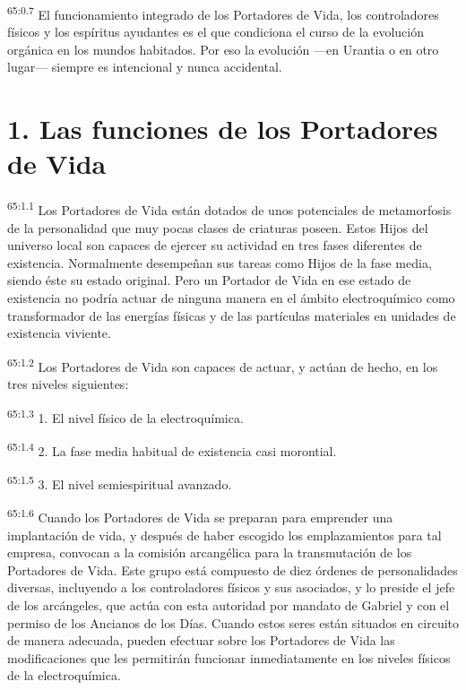 \par
\textsuperscript{65:0.7} El funcionamiento integrado de los Portadores de Vida, los controladores físicos y los espíritus ayudantes es el que condiciona el curso de la evolución orgánica en los mundos habitados. Por eso la evolución ---en Urantia o en otro lugar--- siempre es intencional y nunca accidental.

\section*{1. Las funciones de los Portadores de Vida}
\par
\textsuperscript{65:1.1} Los Portadores de Vida están dotados de unos potenciales de metamorfosis de la personalidad que muy pocas clases de criaturas poseen. Estos Hijos del universo local son capaces de ejercer su actividad en tres fases diferentes de existencia. Normalmente desempeñan sus tareas como Hijos de la fase media, siendo éste su estado original. Pero un Portador de Vida en ese estado de existencia no podría actuar de ninguna manera en el ámbito electroquímico como transformador de las energías físicas y de las partículas materiales en unidades de existencia viviente.

\par
\textsuperscript{65:1.2} Los Portadores de Vida son capaces de actuar, y actúan de hecho, en los tres niveles siguientes:

\par
\textsuperscript{65:1.3} 1. El nivel físico de la electroquímica.

\par
\textsuperscript{65:1.4} 2. La fase media habitual de existencia casi morontial.

\par
\textsuperscript{65:1.5} 3. El nivel semiespiritual avanzado.

\par
\textsuperscript{65:1.6} Cuando los Portadores de Vida se preparan para emprender una implantación de vida, y después de haber escogido los emplazamientos para tal empresa, convocan a la comisión arcangélica para la transmutación de los Portadores de Vida. Este grupo está compuesto de diez órdenes de personalidades diversas, incluyendo a los controladores físicos y sus asociados, y lo preside el jefe de los arcángeles, que actúa con esta autoridad por mandato de Gabriel y con el permiso de los Ancianos de los Días. Cuando estos seres están situados en circuito de manera adecuada, pueden efectuar sobre los Portadores de Vida las modificaciones que les permitirán funcionar inmediatamente en los niveles físicos de la electroquímica.

